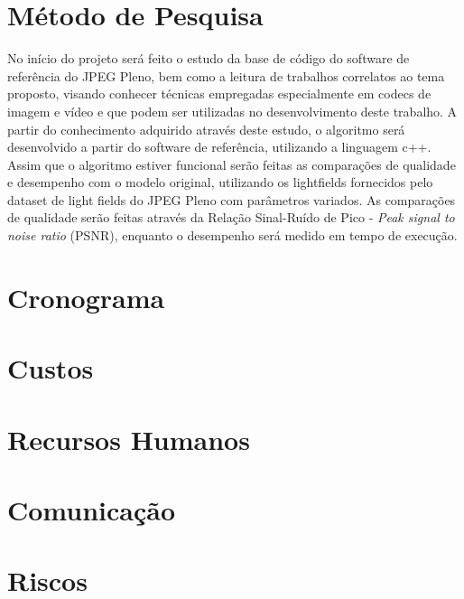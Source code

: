 \section{Método de Pesquisa}
    No início do projeto será feito o estudo da base de código do software de referência do JPEG Pleno, bem como a leitura de trabalhos correlatos ao
    tema proposto, visando conhecer técnicas empregadas especialmente em codecs de imagem e vídeo e que podem ser utilizadas no desenvolvimento deste 
    trabalho. A partir do conhecimento adquirido através deste estudo, o algoritmo será desenvolvido a partir do software de referência, utilizando a 
    linguagem c++. Assim que o algoritmo estiver funcional serão feitas as comparações de qualidade e desempenho com o modelo original, utilizando os 
    lightfields fornecidos pelo dataset de light fields do JPEG Pleno com parâmetros variados. As comparações de qualidade serão feitas através da 
    Relação Sinal-Ruído de Pico - \textit{Peak signal to noise ratio} (PSNR), enquanto o desempenho será medido em tempo de execução.

\section{Cronograma}

\section{Custos}

\section{Recursos Humanos}

\section{Comunicação}

\section{Riscos}